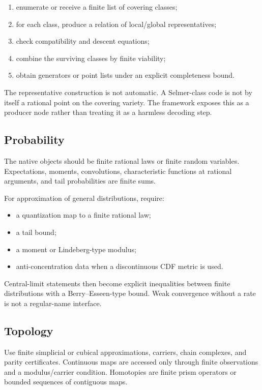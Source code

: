 \begin{enumerate}
\item enumerate or receive a finite list of covering classes;
\item for each class, produce a relation of local/global representatives;
\item check compatibility and descent equations;
\item combine the surviving classes by finite viability;
\item obtain generators or point lists under an explicit completeness bound.
\end{enumerate}

The representative construction is not automatic.  A Selmer-class code is not by itself a rational point on the covering variety.  The framework exposes this as a producer node rather than treating it as a harmless decoding step.

\subsection{Probability}

The native objects should be finite rational laws or finite random variables.  Expectations, moments, convolutions, characteristic functions at rational arguments, and tail probabilities are finite sums.

For approximation of general distributions, require:

\begin{itemize}
\item a quantization map to a finite rational law;
\item a tail bound;
\item a moment or Lindeberg-type modulus;
\item anti-concentration data when a discontinuous CDF metric is used.
\end{itemize}

Central-limit statements then become explicit inequalities between finite distributions with a Berry--Esseen-type bound.  Weak convergence without a rate is not a regular-name interface.

\subsection{Topology}

Use finite simplicial or cubical approximations, carriers, chain complexes, and parity certificates.  Continuous maps are accessed only through finite observations and a modulus/carrier condition.  Homotopies are finite prism operators or bounded sequences of contiguous maps.

